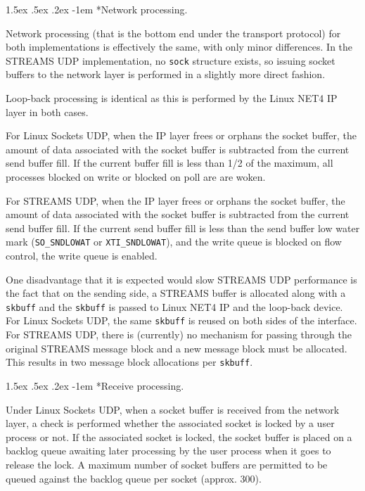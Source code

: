 \documentclass[letterpaper,final,notitlepage,twocolumn,10pt,twoside]{article}
\makeatletter
\renewcommand\paragraph{\@startsection{paragraph}{4}{\z@}%
                                    {1.5ex \@plus .5ex \@minus .2ex}%
                                    {-1em}%
                                    {\normalfont\normalsize\bfseries\slshape}}
\makeatother
\begin{document}
\paragraph*{Network processing.}

Network processing (that is the bottom end under the transport protocol) for both implementations is
effectively the same, with only minor differences.  In the STREAMS UDP implementation, no
\texttt{sock} structure exists, so issuing socket buffers to the network layer is performed in a
slightly more direct fashion.

Loop-back processing is identical as this is performed by the Linux NET4 IP layer in both cases.

For Linux Sockets UDP, when the IP layer frees or orphans the socket buffer, the amount of data
associated with the socket buffer is subtracted from the current send buffer fill.  If the current
buffer fill is less than 1/2 of the maximum, all processes blocked on write or blocked on poll are
are woken.

For STREAMS UDP, when the IP layer frees or orphans the socket buffer, the amount of data
associated with the socket buffer is subtracted from the current send buffer fill.  If the current
send buffer fill is less than the send buffer low water mark (\texttt{SO\_SNDLOWAT} or
\texttt{XTI\_SNDLOWAT}), and the write queue is blocked on flow control, the write queue is enabled.

One disadvantage that it is expected would slow STREAMS UDP performance is the fact that on the
sending side, a STREAMS buffer is allocated along with a \texttt{skbuff} and the \texttt{skbuff} is
passed to Linux NET4 IP and the loop-back device.  For Linux Sockets UDP, the same \texttt{skbuff}
is reused on both sides of the interface.  For STREAMS UDP, there is (currently) no mechanism for
passing through the original STREAMS message block and a new message block must be allocated.  This
results in two message block allocations per \texttt{skbuff}.

\paragraph*{Receive processing.}

Under Linux Sockets UDP, when a socket buffer is received from the network layer, a check is
performed whether the associated socket is locked by a user process or not.  If the associated
socket is locked, the socket buffer is placed on a backlog queue awaiting later processing by the
user process when it goes to release the lock.  A maximum number of socket buffers are permitted to
be queued against the backlog queue per socket (approx. 300).
\end{document}
